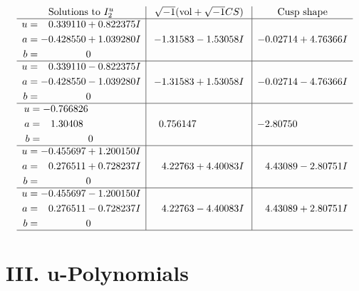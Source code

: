 \documentclass[1p]{elsarticle_modified}
\theoremstyle{definition}
\newcommand{\I}{\sqrt{-1}}
\begin{document}
$$\begin{array}{c|c|c}  
\text{Solutions to }I^u_{2}& \I (\text{vol} + \sqrt{-1}CS) & \text{Cusp shape}\\
 \hline 
\begin{aligned}
u &= \phantom{-}0.339110 + 0.822375 I \\
a &= -0.428550 + 1.039280 I \\
b &= \phantom{-0.000000 } 0\end{aligned}
 & -1.31583 - 1.53058 I & -0.02714 + 4.76366 I \\ \hline\begin{aligned}
u &= \phantom{-}0.339110 - 0.822375 I \\
a &= -0.428550 - 1.039280 I \\
b &= \phantom{-0.000000 } 0\end{aligned}
 & -1.31583 + 1.53058 I & -0.02714 - 4.76366 I \\ \hline\begin{aligned}
u &= -0.766826\phantom{ +0.000000I} \\
a &= \phantom{-}1.30408\phantom{ +0.000000I} \\
b &= \phantom{-0.000000 } 0\end{aligned}
 & \phantom{-}0.756147\phantom{ +0.000000I} & -2.80750\phantom{ +0.000000I} \\ \hline\begin{aligned}
u &= -0.455697 + 1.200150 I \\
a &= \phantom{-}0.276511 + 0.728237 I \\
b &= \phantom{-0.000000 } 0\end{aligned}
 & \phantom{-}4.22763 + 4.40083 I & \phantom{-}4.43089 - 2.80751 I \\ \hline\begin{aligned}
u &= -0.455697 - 1.200150 I \\
a &= \phantom{-}0.276511 - 0.728237 I \\
b &= \phantom{-0.000000 } 0\end{aligned}
 & \phantom{-}4.22763 - 4.40083 I & \phantom{-}4.43089 + 2.80751 I\\
 \hline 
 \end{array}$$\newpage
\newpage\renewcommand{\arraystretch}{1}
\centering \section*{ III. u-Polynomials}
\end{document}

